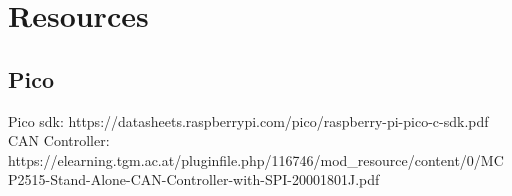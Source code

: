 \section{Resources}
\subsection{Pico}
Pico sdk: https://datasheets.raspberrypi.com/pico/raspberry-pi-pico-c-sdk.pdf
CAN Controller: https://elearning.tgm.ac.at/pluginfile.php/116746/mod_resource/content/0/MCP2515-Stand-Alone-CAN-Controller-with-SPI-20001801J.pdf